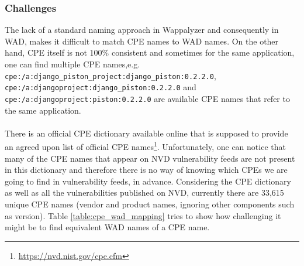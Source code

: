 \subsubsection{Challenges}
The lack of a standard naming approach in Wappalyzer and consequently in WAD, makes it difficult to match CPE names to WAD names. On the other hand, CPE itself is not 100\% consistent and sometimes for the same application, one can find multiple CPE names,e.g. \texttt{cpe:/a:django\_piston\_project:django\_piston:0.2.2.0}, \texttt{cpe:/a:djangoproject:django\_piston:0.2.2.0} and \texttt{cpe:/a:djangoproject:piston:0.2.2.0} are available CPE names that refer to the same application.
\paragraph{}
There is an official CPE dictionary available online that is supposed to provide an agreed upon list of official CPE names\footnote{\url{https://nvd.nist.gov/cpe.cfm}}. Unfortunately, one can notice that many of the CPE names that appear on NVD vulnerability feeds are not present in this dictionary and therefore there is no way of knowing which CPEs we are going to find in vulnerability feeds, in advance. Considering the CPE dictionary as well as all the vulnerabilities published on NVD, currently there are 33,615 unique CPE names (vendor and product names, ignoring other components such as version). Table \ref{table:cpe_wad_mapping} tries to show how challenging it might be to find equivalent WAD names of a CPE name.


